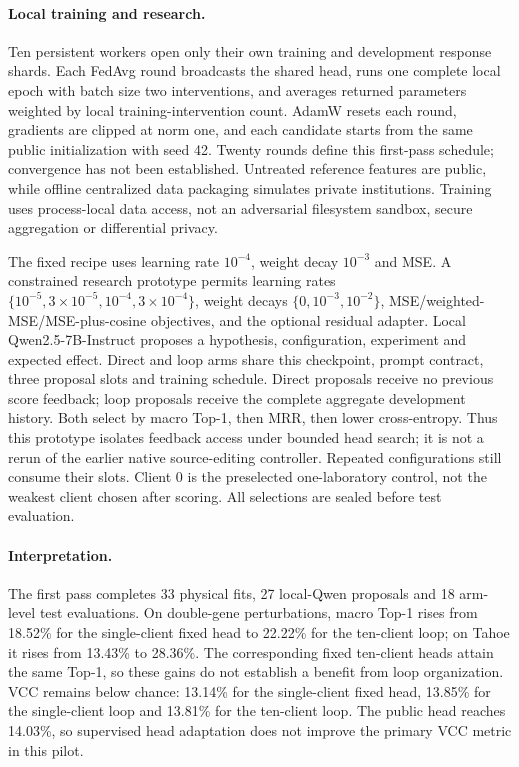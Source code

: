 \paragraph{Local training and research.}
Ten persistent workers open only their own training and development response shards. Each FedAvg round broadcasts the shared head, runs one complete local epoch with batch size two interventions, and averages returned parameters weighted by local training-intervention count. AdamW resets each round, gradients are clipped at norm one, and each candidate starts from the same public initialization with seed 42. Twenty rounds define this first-pass schedule; convergence has not been established. Untreated reference features are public, while offline centralized data packaging simulates private institutions. Training uses process-local data access, not an adversarial filesystem sandbox, secure aggregation or differential privacy.

The fixed recipe uses learning rate $10^{-4}$, weight decay $10^{-3}$ and MSE. A constrained research prototype permits learning rates $\{10^{-5},3\times10^{-5},10^{-4},3\times10^{-4}\}$, weight decays $\{0,10^{-3},10^{-2}\}$, MSE/weighted-MSE/MSE-plus-cosine objectives, and the optional residual adapter. Local Qwen2.5-7B-Instruct proposes a hypothesis, configuration, experiment and expected effect. Direct and loop arms share this checkpoint, prompt contract, three proposal slots and training schedule. Direct proposals receive no previous score feedback; loop proposals receive the complete aggregate development history. Both select by macro Top-1, then MRR, then lower cross-entropy. Thus this prototype isolates feedback access under bounded head search; it is not a rerun of the earlier native source-editing controller. Repeated configurations still consume their slots. Client 0 is the preselected one-laboratory control, not the weakest client chosen after scoring. All selections are sealed before test evaluation.



\paragraph{Interpretation.}
The first pass completes 33 physical fits, 27 local-Qwen proposals and 18 arm-level test evaluations. On double-gene perturbations, macro Top-1 rises from 18.52\% for the single-client fixed head to 22.22\% for the ten-client loop; on Tahoe it rises from 13.43\% to 28.36\%. The corresponding fixed ten-client heads attain the same Top-1, so these gains do not establish a benefit from loop organization. VCC remains below chance: 13.14\% for the single-client fixed head, 13.85\% for the single-client loop and 13.81\% for the ten-client loop. The public head reaches 14.03\%, so supervised head adaptation does not improve the primary VCC metric in this pilot.

